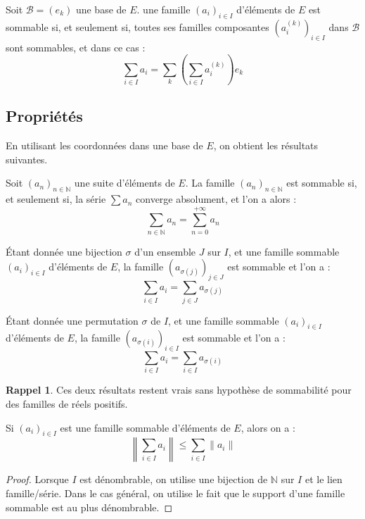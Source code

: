 \documentclass[french]{article}
\newcommand{\N}{\mathbb{N}}
\theoremstyle{plain}
\theoremstyle{definition}
\newtheorem*{rappel}{Rappel}
\theoremstyle{remark}
\begin{document}
\begin{cor}%
	Soit $\mathcal{B}=(e_k)$ une base de $E$. une famille $(a_i)_{i\in I}$ d'éléments de $E$ est sommable si, et seulement si, toutes ses familles composantes $(a_i^{(k)})_{i\in I}$ dans $\mathcal{B}$ sont sommables, et dans ce cas : $$\sum_{i\in I}a_i=\sum_k\left(\sum_{i\in I}a_i^{(k)}\right)e_k$$
\end{cor}

\subsection{Propriétés}

En utilisant les coordonnées dans une base de $E$, on obtient les résultats suivantes.

\begin{prop}%
	Soit $(a_n)_{n\in\N}$ une suite d'éléments de $E$. La famille $(a_n)_{n\in\N}$ est sommable si, et seulement si, la série $\displaystyle\sum a_n$ converge absolument, et l'on a alors : $$\sum_{n\in\N}a_n=\sum_{n=0}^{+\infty}a_n$$
\end{prop}

\begin{prop}%
	Étant donnée une bijection $\sigma$ d'un ensemble $J$ sur $I$, et une famille sommable $(a_i)_{i\in I}$ d'éléments de $E$, la famille $(a_{\sigma(j)})_{j\in J}$ est sommable et l'on a : $$\sum_{i\in I}a_i=\sum_{j\in J}a_{\sigma(j)}$$
\end{prop}

\begin{prop}[Commutativité]%
	Étant donnée une permutation $\sigma$ de $I$, et une famille sommable $(a_i)_{i\in I}$ d'éléments de $E$, la famille $(a_{\sigma(i)})_{i\in I}$ est sommable et l'on a : $$\sum_{i\in I}a_i=\sum_{i\in I}a_{\sigma(i)}$$
\end{prop}

\begin{rappel}
	Ces deux résultats restent vrais sans hypothèse de sommabilité pour des familles de réels positifs.
\end{rappel}

\begin{thm}
	Si $(a_i)_{i\in I}$ est une famille sommable d'éléments de $E$, alors on a : $$\left\lVert\sum_{i\in I}a_i\right\rVert\leqslant\sum_{i\in I}\lVert a_i\rVert$$
\end{thm}
\begin{proof}
	Lorsque $I$ est dénombrable, on utilise une bijection de $\N$ sur $I$ et le lien famille/série. Dans le cas général, on utilise le fait que le support d'une famille sommable est au plus dénombrable.
\end{proof}
\end{document}
